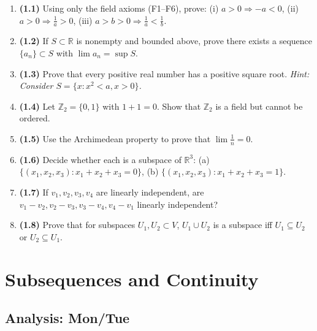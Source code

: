 \documentclass[11pt, letterpaper, openany]{book}
\newcounter{exercise}[chapter]
\begin{document}
\begin{exercises}
\begin{enumerate}
    \item \textbf{(1.1)} Using only the field axioms (F1--F6), prove: (i) $a > 0 \Rightarrow -a < 0$, (ii) $a > 0 \Rightarrow \frac{1}{a} > 0$, (iii) $a > b > 0 \Rightarrow \frac{1}{a} < \frac{1}{b}$.
    
    \item \textbf{(1.2)} If $S \subset \mathbb{R}$ is nonempty and bounded above, prove there exists a sequence $\{a_n\} \subset S$ with $\lim a_n = \sup S$.
    
    \item \textbf{(1.3)} Prove that every positive real number has a positive square root. \textit{Hint: Consider $S = \{x : x^2 < a, x > 0\}$.}
    
    \item \textbf{(1.4)} Let $\mathbb{Z}_2 = \{0, 1\}$ with $1 + 1 = 0$. Show that $\mathbb{Z}_2$ is a field but cannot be ordered.
    
    \item \textbf{(1.5)} Use the Archimedean property to prove that $\lim \frac{1}{n} = 0$.
    
    \item \textbf{(1.6)} Decide whether each is a subspace of $\mathbb{R}^3$: (a) $\{(x_1,x_2,x_3) : x_1 + x_2 + x_3 = 0\}$, (b) $\{(x_1,x_2,x_3) : x_1 + x_2 + x_3 = 1\}$.
    
    \item \textbf{(1.7)} If $v_1, v_2, v_3, v_4$ are linearly independent, are $v_1 - v_2, v_2 - v_3, v_3 - v_4, v_4 - v_1$ linearly independent?
    
    \item \textbf{(1.8)} Prove that for subspaces $U_1, U_2 \subset V$, $U_1 \cup U_2$ is a subspace iff $U_1 \subseteq U_2$ or $U_2 \subseteq U_1$.
\end{enumerate}
\end{exercises}

\chapter{Subsequences and Continuity}

\section{Analysis: Mon/Tue}
\end{document}
